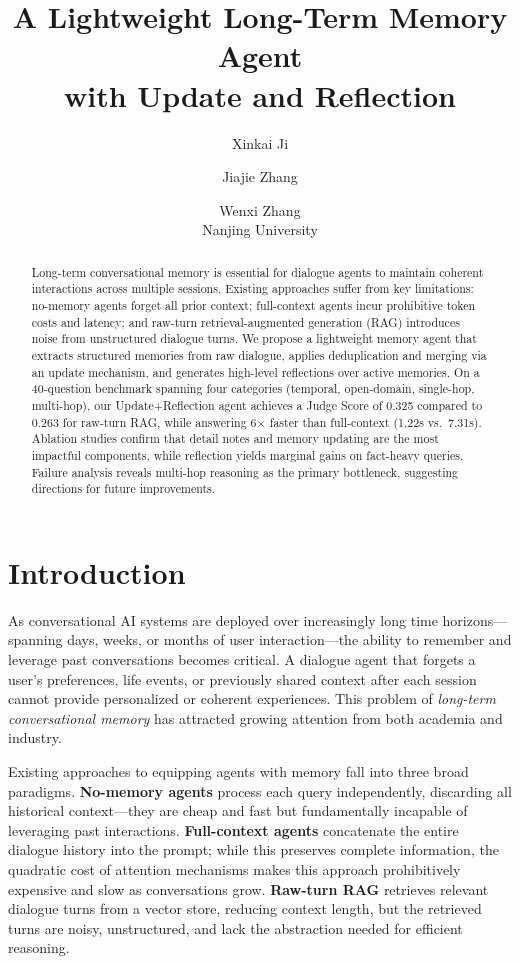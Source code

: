 \documentclass[11pt]{article}
\title{A Lightweight Long-Term Memory Agent \\ with Update and Reflection}
\author{Xinkai Ji  \and Jiajie Zhang \and Wenxi Zhang \\
  Nanjing University}
\begin{document}
\maketitle

\begin{abstract}
Long-term conversational memory is essential for dialogue agents to maintain coherent interactions across multiple sessions. Existing approaches suffer from key limitations: no-memory agents forget all prior context; full-context agents incur prohibitive token costs and latency; and raw-turn retrieval-augmented generation (RAG) introduces noise from unstructured dialogue turns. We propose a lightweight memory agent that extracts structured memories from raw dialogue, applies deduplication and merging via an update mechanism, and generates high-level reflections over active memories. On a 40-question benchmark spanning four categories (temporal, open-domain, single-hop, multi-hop), our Update+Reflection agent achieves a Judge Score of 0.325 compared to 0.263 for raw-turn RAG, while answering 6$\times$ faster than full-context (1.22s vs.\ 7.31s). Ablation studies confirm that detail notes and memory updating are the most impactful components, while reflection yields marginal gains on fact-heavy queries. Failure analysis reveals multi-hop reasoning as the primary bottleneck, suggesting directions for future improvements.
\end{abstract}

\section{Introduction}

As conversational AI systems are deployed over increasingly long time horizons---spanning days, weeks, or months of user interaction---the ability to remember and leverage past conversations becomes critical. A dialogue agent that forgets a user's preferences, life events, or previously shared context after each session cannot provide personalized or coherent experiences. This problem of \textit{long-term conversational memory} has attracted growing attention from both academia and industry.

Existing approaches to equipping agents with memory fall into three broad paradigms. \textbf{No-memory agents} process each query independently, discarding all historical context---they are cheap and fast but fundamentally incapable of leveraging past interactions. \textbf{Full-context agents} concatenate the entire dialogue history into the prompt; while this preserves complete information, the quadratic cost of attention mechanisms makes this approach prohibitively expensive and slow as conversations grow. \textbf{Raw-turn RAG} retrieves relevant dialogue turns from a vector store, reducing context length, but the retrieved turns are noisy, unstructured, and lack the abstraction needed for efficient reasoning.
\end{document}
